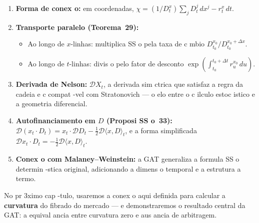 {\begin{enumerate}
 \item \textbf{Forma de conex o:} em coordenadas,
 $\chi = (1/D_t^x)\sum_j D_t^j\,dx^j - r_t^x\,dt$.

 \item \textbf{Transporte paralelo (Teorema~29):}
 \begin{itemize}
 \item Ao longo de $x$-linhas: multiplica SS o pela taxa de
 c mbio $D_{t_0}^{x_0}/D_{t_0}^{x_0 + \Delta x}$.
 \item Ao longo de $t$-linhas: divis o pelo fator de desconto
 $\exp(\int_{t_0}^{t_0+\Delta t} r_u^{x_0}\,du)$.
 \end{itemize}

 \item \textbf{Derivada de Nelson:} $\mathcal{D}X_t$, a derivada
 sim ctrica que satisfaz a regra da cadeia e c compat -vel com
 Stratonovich --- o elo entre o c ilculo estoc istico e a
 geometria diferencial.

 \item \textbf{Autofinanciamento em $D$ (Proposi SS o~33):}
 $\mathcal{D}(x_t \cdot D_t) = x_t \cdot \mathcal{D}D_t
 - \frac{1}{2}\mathcal{D}\langle x, D\rangle_t$, e a forma
 simplificada $\mathcal{D}x_t \cdot D_t
 = -\frac{1}{2}\mathcal{D}\langle x, D\rangle_t$.

 \item \textbf{Conex o com Malaney--Weinstein:} a GAT generaliza a
 formula SS o determin -stica original, adicionando a dimens o
 temporal e a estrutura a termo.
\end{enumerate}

No pr 3ximo cap -tulo, usaremos a conex o aqui definida para calcular a
\textbf{curvatura} do fibrado do mercado --- e demonstraremos o
resultado central da GAT: a equival ancia entre curvatura zero e aus ancia
de arbitragem.

\begin{center}
\end{center}

}
